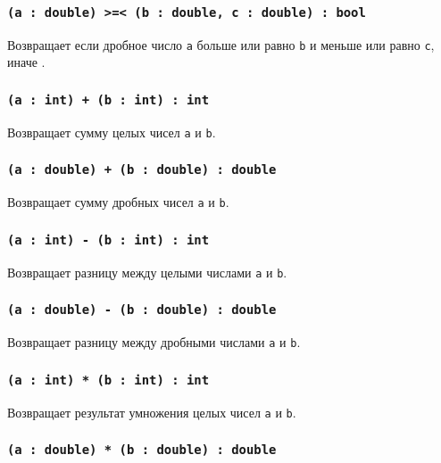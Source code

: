 \subsubsection{\texttt{(a : double) >=< (b : double, c : double) : bool}}

Возвращает \true{} если дробное число \texttt{a} больше или равно \texttt{b} и меньше или равно \texttt{c}, иначе \false{}.


\subsubsection{\texttt{(a : int) + (b : int) : int}}

Возвращает сумму целых чисел \texttt{a} и \texttt{b}.

\subsubsection{\texttt{(a : double) + (b : double) : double}}

Возвращает сумму дробных чисел \texttt{a} и \texttt{b}.

\subsubsection{\texttt{(a : int) - (b : int) : int}}

Возвращает разницу между целыми числами \texttt{a} и \texttt{b}.

\subsubsection{\texttt{(a : double) - (b : double) : double}}

Возвращает разницу между дробными числами \texttt{a} и \texttt{b}.

\subsubsection{\texttt{(a : int) * (b : int) : int}}

Возвращает результат умножения целых чисел \texttt{a} и \texttt{b}.

\subsubsection{\texttt{(a : double) * (b : double) : double}}

